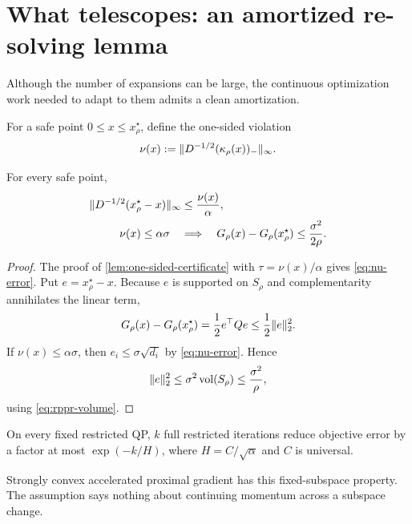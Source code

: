 \section{What telescopes: an amortized re-solving lemma}
\label{sec:amortized}

Although the number of expansions can be large, the continuous optimization
work needed to adapt to them admits a clean amortization.

For a safe point $0\leq x\leq x_\rho^\star$, define the one-sided violation
\begin{equation}
  \nu(x):=\lVert D^{-1/2}(\kappa_\rho(x))_-\rVert_\infty.
  \label{eq:nu}
\end{equation}

\begin{lemma}
\label{lem:violation-gap}
For every safe point,
\begin{align}
 \lVert D^{-1/2}(x_\rho^\star-x)\rVert_\infty
 &\leq\frac{\nu(x)}\alpha,
 \label{eq:nu-error}\\
 \nu(x)\leq\alpha\sigma
 \quad&\Longrightarrow\quad
 G_\rho(x)-G_\rho(x_\rho^\star)
 \leq\frac{\sigma^2}{2\rho}.
 \label{eq:nu-gap}
\end{align}
\end{lemma}

\begin{proof}
The proof of \cref{lem:one-sided-certificate} with
$\tau=\nu(x)/\alpha$ gives \cref{eq:nu-error}.  Put
$e=x_\rho^\star-x$.  Because $e$ is supported on $S_\rho$ and complementarity
annihilates the linear term,
\begin{equation}
 G_\rho(x)-G_\rho(x_\rho^\star)=\frac12e^\top Qe
 \leq\frac12\lVert e\rVert_2^2.
\end{equation}
If $\nu(x)\leq\alpha\sigma$, then $e_i\leq\sigma\sqrt{d_i}$ by
\cref{eq:nu-error}.  Hence
\[
 \lVert e\rVert_2^2
 \leq\sigma^2\operatorname{vol}(S_\rho)
 \leq\frac{\sigma^2}\rho,
\]
using \cref{eq:rppr-volume}.
\end{proof}

\begin{assumption}
\label{ass:contraction}
On every fixed restricted QP, $k$ full restricted iterations reduce objective
error by a factor at most $\exp(-k/H)$, where
$H=C/\sqrt\alpha$ and $C$ is universal.
\end{assumption}

Strongly convex accelerated proximal gradient has this fixed-subspace
property.  The assumption says nothing about continuing momentum across a
subspace change.

